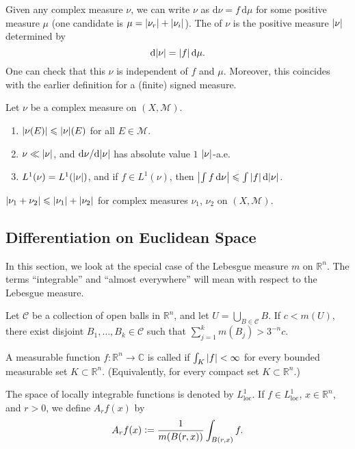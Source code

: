 \documentclass[12pt]{article}	%
\newcommand{\loc}{L^{1}_{\operatorname{loc}}}
\begin{document}
Given any complex measure $\nu$, we can write $\nu$ as ${\mathrm d}\nu = f \,{\mathrm d}\mu$ for some positive measure $\mu$ (one candidate is $\mu = {\left\lvert \nu_{r} \right\lvert} + {\left\lvert \nu_{i} \right\lvert}$). The  of $\nu$ is the positive measure ${\left\lvert \nu \right\lvert}$ determined by 
\begin{equation*} 
	{\mathrm d}{\left\lvert \nu \right\lvert} = {\left\lvert f \right\lvert} \,{\mathrm d}\mu.
\end{equation*}
One can check that this $\nu$ is independent of $f$ and $\mu$. Moreover, this coincides with the earlier definition for a (finite) signed measure.

\begin{prop}
	Let $\nu$ be a complex measure on $(X, \mathcal{M})$.
	\begin{enumerate}
		\item ${\left\lvert \nu(E) \right\lvert} \leqslant {\left\lvert \nu \right\lvert}(E)$ for all $E \in \mathcal{M}$.
		\item $\nu \ll {\left\lvert \nu \right\lvert}$, and ${\mathrm d}\nu/{\mathrm d}{\left\lvert \nu \right\lvert}$ has absolute value $1$ ${\left\lvert \nu \right\lvert}$-a.e.
		\item $L^{1}(\nu) = L^{1}({\left\lvert \nu \right\lvert})$, and if $f \in L^{1}(\nu)$, then ${\left\lvert \int f \,{\mathrm{d}}\nu \right\lvert} \leqslant \int {\left\lvert f \right\lvert} \,{\mathrm{d}}{\left\lvert \nu \right\lvert}$.
	\end{enumerate}
\end{prop}

\begin{prop}
	${\left\lvert \nu_{1} + \nu_{2} \right\lvert} \leqslant {\left\lvert \nu_{1} \right\lvert} + {\left\lvert \nu_{2} \right\lvert}$ for complex measures $\nu_{1}$, $\nu_{2}$ on $(X, \mathcal{M})$.
\end{prop}

\subsection{Differentiation on Euclidean Space}

In this section, we look at the special case of the Lebesgue measure $m$ on $\mathbb{R}^{n}$. The terms ``integrable'' and ``almost everywhere'' will mean with respect to the Lebesgue measure.

\begin{prop}
	Let $\mathcal{C}$ be a collection of open balls in $\mathbb{R}^{n}$, and let $U = \bigcup_{B \in \mathcal{C}} B$. If $c < m(U)$, there exist disjoint $B_{1}, \ldots, B_{k} \in \mathcal{C}$ such that $\sum_{j = 1}^{k} m(B_{j}) > 3^{-n} c$.
\end{prop}

\begin{defn}
	A measurable function $f : \mathbb{R}^{n} \to \mathbb{C}$ is called  if $\int_{K} {\left\lvert f \right\lvert} < \infty$ for every bounded measurable set $K \subset \mathbb{R}^{n}$. (Equivalently, for every compact set $K \subset \mathbb{R}^{n}$.)

	The space of locally integrable functions is denoted by $\loc$. If $f \in \loc$, $x \in \mathbb{R}^{n}$, and $r > 0$, we define $A_{r}f(x)$ by
	\begin{equation*} 
		A_{r}f(x) \vcentcolon= \frac{1}{m(B(r, x))} \int_{B(r, x)} f.
	\end{equation*}
\end{defn}
\end{document}
